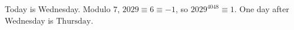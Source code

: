Today is Wednesday. Modulo $7$, $2029\equiv6\equiv-1$, so $2029^{4048}\equiv1$. One day after Wednesday is $\boxed{\text{Thursday}}$.
